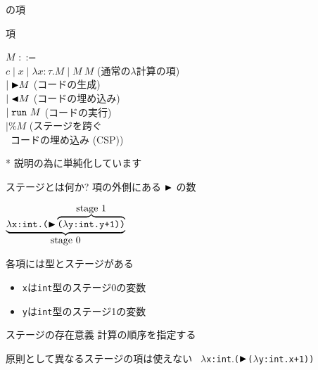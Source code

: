 \documentclass[dvipdfmx,aspectratio=169, 20pt]{beamer}
\newcommand{\xmark}{\ding{55}}%
\begin{document}
\begin{frame}[fragile]{\LMD の項}
    \begin{block}{項}
        \begin{tabbing}
            \hspace{5mm} \( M \) \= \( ::= \) \hspace{50mm} \= \\
            \> \( c \mid x \mid \lambda x:\tau.M \mid M\ M \) \> (通常の$\lambda$計算の項) \\
            \> \( \mid {\mathop{\blacktriangleright}} M \) \> (コードの生成) \\
            \> \( \mid {\mathop{\blacktriangleleft}} M \) \> (コードの埋め込み) \\
            \> \( \mid \verb|run|\ M \) \> (コードの実行) \\
            \> \( \mid \% M \) \> (ステージを跨ぐ \\
            \> \> \ コードの埋め込み (CSP))
        \end{tabbing}
    \end{block}
    * 説明の為に単純化しています
\end{frame}

\begin{frame}[fragile]{ステージとは何か?}
    項の外側にある \( {\mathop{\blacktriangleright}} \) の数
    \begin{exampleblock}{}
        \begin{center}
            \( \underbrace{\lambda \texttt{x:int.(}\TB\overbrace{{\texttt{(}}\lambda \texttt{y:int.y+1))}}^{\let\scriptstyle\textstyle\substack{\text{stage }1}}}_{\let\scriptstyle\textstyle\substack{\text{stage }0}} \)
        \end{center}
    \end{exampleblock}
    各項には型とステージがある
    \begin{itemize}
        \item {\tt x}は{\tt int}型のステージ0の変数
        \item {\tt y}は{\tt int}型のステージ1の変数
    \end{itemize}
\end{frame}

\begin{frame}[fragile]{ステージの存在意義}
    計算の順序を指定する
    \begin{exampleblock}{}
    \begin{*align}

    \end{*align}
    \end{exampleblock}
    \begin{alertblock}{原則として異なるステージの項は使えない}
        \xmark\ $\lambda$\texttt{x:int}.\texttt{(}${\mathop{\blacktriangleright}}$\texttt{(}$\lambda$\texttt{y:int.}{\tt x}\texttt{+1))}
    \end{alertblock}
\end{frame}
\end{document}
